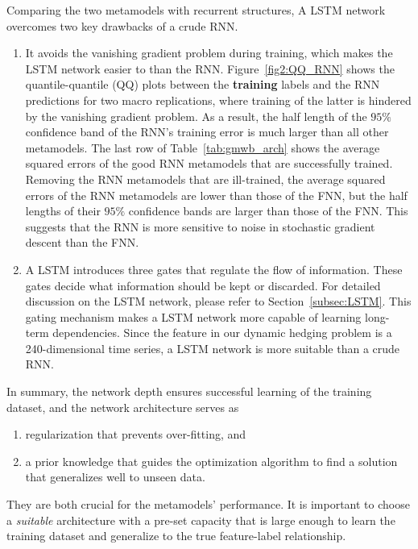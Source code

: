 Comparing the two metamodels with recurrent structures, A LSTM network overcomes two key drawbacks of a crude RNN.
\begin{enumerate}
    \item It avoids the vanishing gradient problem during training, which makes the LSTM network easier to than the RNN. Figure~\ref{fig2:QQ_RNN} shows the quantile-quantile (QQ) plots between the \textbf{training} labels and the RNN predictions for two macro replications, where training of the latter is hindered by the vanishing gradient problem. 
    As a result, the half length of the $95\%$ confidence band of the RNN's training error is much larger than all other metamodels. The last row of Table~\ref{tab:gmwb_arch} shows the average squared errors of the good RNN metamodels that are successfully trained. 
    Removing the RNN metamodels that are ill-trained, the average squared errors of the RNN metamodels are lower than those of the FNN, but the half lengths of their $95\%$ confidence bands are larger than those of the FNN. 
    This suggests that the RNN is more sensitive to noise in stochastic gradient descent than the FNN.
    \item A LSTM introduces three gates that regulate the flow of information. 
    These gates decide what information should be kept or discarded.
    For detailed discussion on the LSTM network, please refer to Section~\ref{subsec:LSTM}.
    This gating mechanism makes a LSTM network more capable of learning long-term dependencies. 
    Since the feature in our dynamic hedging problem is a 240-dimensional time series, a LSTM network is more suitable than a crude RNN.
\end{enumerate}
In summary, the network depth ensures successful learning of the training dataset, and the network architecture serves as 
\begin{enumerate}
    \item regularization that prevents over-fitting, and 
    \item a prior knowledge that guides the optimization algorithm to find a solution that generalizes well to unseen data.
\end{enumerate}
They are both crucial for the metamodels' performance.
It is important to choose a \textit{suitable} architecture with a pre-set capacity that is large enough to learn the training dataset and generalize to the true feature-label relationship.

